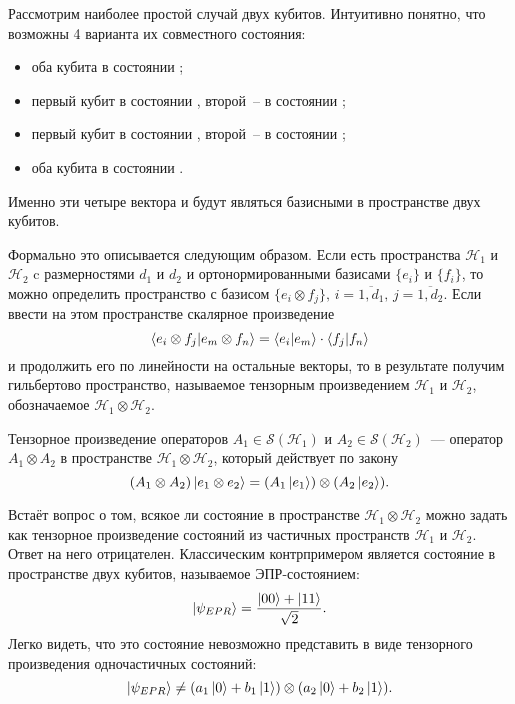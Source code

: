 Рассмотрим наиболее простой случай двух кубитов. Интуитивно понятно, что возможны 4 варианта их совместного состояния:
\begin{itemize}
  \item оба кубита в состоянии ;
  \item первый кубит в состоянии , второй~-- в состоянии ;
  \item первый кубит в состоянии , второй~-- в состоянии ;
  \item оба кубита в состоянии .
\end{itemize}
Именно эти четыре вектора и будут являться базисными в пространстве двух кубитов.

Формально это описывается следующим образом. Если есть пространства $\mathcal{H}_1$ и $\mathcal{H}_2$ c размерностями $d_1$ и $d_2$ и ортонормированными базисами $\{e_i\}$ и $\{f_i\}$, то можно определить пространство с базисом $\{e_i \otimes f_j\},\, i = \overline{1,d_1},\, j = \overline{1,d_2}$. Если ввести на этом пространстве скалярное произведение
\begin{equation}
  \left\langle e_i \otimes f_j|e_m \otimes f_n\right\rangle = \left\langle e_i|e_m\right\rangle \cdot \left\langle f_j|f_n\right\rangle 
\end{equation}
 и продолжить его по линейности на остальные векторы, то в результате получим гильбертово пространство, называемое тензорным произведением $\mathcal{H}_1$ и $\mathcal{H}_2$, обозначаемое $\mathcal{H}_1 \otimes \mathcal{H}_2$.

Тензорное произведение операторов $A_1 \in \mathcal{S}(\mathcal{H}_1)$ и $A_2 \in \mathcal{S}(\mathcal{H}_2)$~--- оператор $A_1 \otimes A_2$ в пространстве $\mathcal{H}_1 \otimes \mathcal{H}_2$, который действует по закону
\begin{equation} 
  (A_1 \otimes A_2)\left| e_1 \otimes e_2 \right\rangle = (A_1\left| e_1 \right\rangle)\otimes(A_2\left| e_2 \right\rangle). 
\end{equation}

Встаёт вопрос о том, всякое ли состояние в пространстве $\mathcal{H}_1 \otimes \mathcal{H}_2$ можно задать как тензорное произведение состояний из частичных пространств $\mathcal{H}_1$ и $\mathcal{H}_2$. Ответ на него отрицателен.
Классическим контрпримером является состояние в пространстве двух кубитов, называемое ЭПР-состоянием:
\begin{equation}\label{epr_state}  
  \left| \psi_{EPR} \right\rangle = \frac{\left| 00 \right\rangle + \left| 11 \right\rangle}{\sqrt{2}}.
\end{equation}
Легко видеть, что это состояние невозможно представить в виде тензорного произведения одночастичных состояний: 
\begin{equation}
  \left| \psi_{EPR} \right\rangle \neq (a_1\left| 0 \right\rangle + b_1\left| 1 \right\rangle) \otimes (a_2 \left| 0 \right\rangle + b_2 \left| 1 \right\rangle).
\end{equation}


